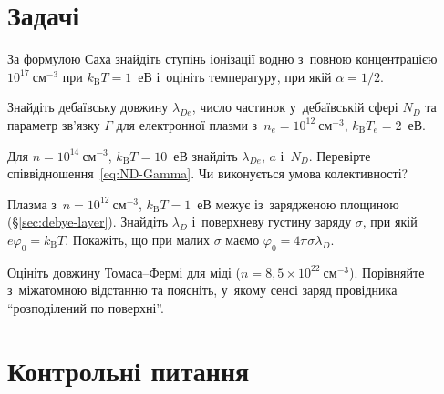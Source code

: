 \section*{Задачі}

\begin{problem}\label{prb:PlasmaSaha}
	За формулою Саха знайдіть ступінь іонізації водню з~повною концентрацією
	$10^{17}~\mathrm{см}^{-3}$ при $k_{\mathrm B}T=1$~еВ і~оцініть температуру, при якій
	$\alpha=1/2$.
\end{problem}

\begin{problem}\label{prb:PlasmaDebye}
	Знайдіть дебаївську довжину $\lambda_{De}$, число частинок у~дебаївській сфері $N_D$
	та параметр зв'язку $\Gamma$ для електронної плазми з~$n_e=10^{12}~\mathrm{см}^{-3}$,
	$k_{\mathrm B}T_e=2$~еВ.
\end{problem}

\begin{problem}\label{prb:PlasmaCollective}
	Для $n=10^{14}~\mathrm{см}^{-3}$, $k_{\mathrm B}T=10$~еВ знайдіть $\lambda_{De}$, $a$
	і~$N_D$. Перевірте співвідношення~\eqref{eq:ND-Gamma}. Чи виконується умова
	колективності?
\end{problem}

\begin{problem}\label{prb:PlasmaDebyeLayer}
	Плазма з~$n=10^{12}~\mathrm{см}^{-3}$, $k_{\mathrm B}T=1$~еВ межує із~зарядженою
	площиною (§\ref{sec:debye-layer}). Знайдіть $\lambda_D$ і~поверхневу густину заряду
	$\sigma$, при якій $e\varphi_0=k_{\mathrm B}T$. Покажіть, що при малих $\sigma$ маємо
	$\varphi_0=4\pi\sigma\lambda_D$.
\end{problem}

\begin{problem}\label{prb:PlasmaThomasFermi}
	Оцініть довжину Томаса--Фермі для міді ($n=8{,}5\times10^{22}~\mathrm{см}^{-3}$).
	Порівняйте з~міжатомною відстанню та поясніть, у~якому сенсі заряд провідника
	\enquote{розподілений по поверхні}.
\end{problem}

\section*{Контрольні питання}

